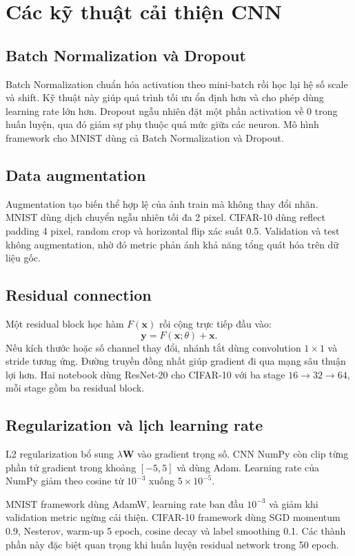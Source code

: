 \documentclass[12pt,a4paper]{report}
\begin{document}
\section{Các kỹ thuật cải thiện CNN}
\subsection{Batch Normalization và Dropout}
Batch Normalization chuẩn hóa activation theo mini-batch rồi học lại hệ số scale và shift.
Kỹ thuật này giúp quá trình tối ưu ổn định hơn và cho phép dùng learning rate lớn hơn.
Dropout ngẫu nhiên đặt một phần activation về 0 trong huấn luyện, qua đó giảm sự phụ thuộc quá mức giữa các neuron.
Mô hình framework cho MNIST dùng cả Batch Normalization và Dropout.

\subsection{Data augmentation}
Augmentation tạo biến thể hợp lệ của ảnh train mà không thay đổi nhãn.
MNIST dùng dịch chuyển ngẫu nhiên tối đa 2 pixel.
CIFAR-10 dùng reflect padding 4 pixel, random crop và horizontal flip xác suất 0.5.
Validation và test không augmentation, nhờ đó metric phản ánh khả năng tổng quát hóa trên dữ liệu gốc.

\subsection{Residual connection}
Một residual block học hàm $F(\mathbf{x})$ rồi cộng trực tiếp đầu vào:
\begin{equation}
    \mathbf{y}=F(\mathbf{x};\theta)+\mathbf{x}.
\end{equation}
Nếu kích thước hoặc số channel thay đổi, nhánh tắt dùng convolution $1\times1$ và stride tương ứng.
Đường truyền đồng nhất giúp gradient đi qua mạng sâu thuận lợi hơn.
Hai notebook dùng ResNet-20 cho CIFAR-10 với ba stage $16\to32\to64$, mỗi stage gồm ba residual block.

\subsection{Regularization và lịch learning rate}
L2 regularization bổ sung $\lambda\mathbf{W}$ vào gradient trọng số.
CNN NumPy còn clip từng phần tử gradient trong khoảng $[-5,5]$ và dùng Adam.
Learning rate của NumPy giảm theo cosine từ $10^{-3}$ xuống $5\times10^{-5}$.

MNIST framework dùng AdamW, learning rate ban đầu $10^{-3}$ và giảm khi validation metric ngừng cải thiện.
CIFAR-10 framework dùng SGD momentum 0.9, Nesterov, warm-up 5 epoch, cosine decay và label smoothing 0.1.
Các thành phần này đặc biệt quan trọng khi huấn luyện residual network trong 50 epoch.
\end{document}
